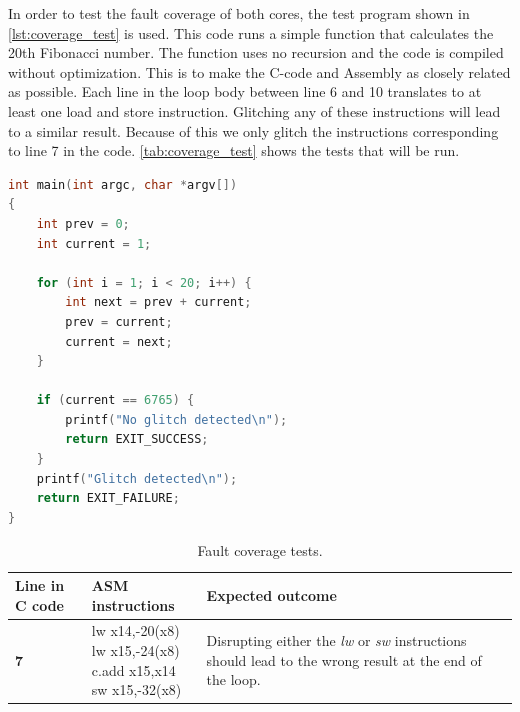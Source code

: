 In order to test the fault coverage of both cores, the test program shown in \autoref{lst:coverage_test} is used. This code runs a simple function that calculates the 20th Fibonacci number. The function uses no recursion and the code is compiled without optimization. This is to make the C-code and Assembly as closely related as possible. Each line in the loop body between line 6 and 10 translates to at least one load and store instruction. Glitching any of these instructions will lead to a similar result. Because of this we only glitch the instructions corresponding to line 7 in the code. \autoref{tab:coverage_test} shows the tests that will be run. 


\begin{lstlisting}[caption={Test code for simulating glitch in address-bus.}, label=lst:coverage_test, language=C++]
int main(int argc, char *argv[])
{
    int prev = 0;
    int current = 1;

    for (int i = 1; i < 20; i++) {
        int next = prev + current;
        prev = current;
        current = next;
    }

    if (current == 6765) {
        printf("No glitch detected\n");
        return EXIT_SUCCESS;
    }
    printf("Glitch detected\n");
    return EXIT_FAILURE;
}
\end{lstlisting}

\begin{table}[h]
\centering
\caption{Fault coverage tests.}
\label{tab:coverage_test}
\begin{tabular}{m{2.5cm}m{3.5cm}m{7.5cm}}
\toprule 
Line in C code & ASM instructions & Expected outcome \\
\midrule
\rowcolor{black!20} \textbf{7} & \makecell{lw	x14,-20(x8) \\ lw x15,-24(x8) \\ c.add x15,x14 \\ sw x15,-32(x8)} & Disrupting either the \textit{lw} or \textit{sw} instructions should lead to the wrong result at the end of the loop.\\
\bottomrule
\end{tabular}
\end{table}


